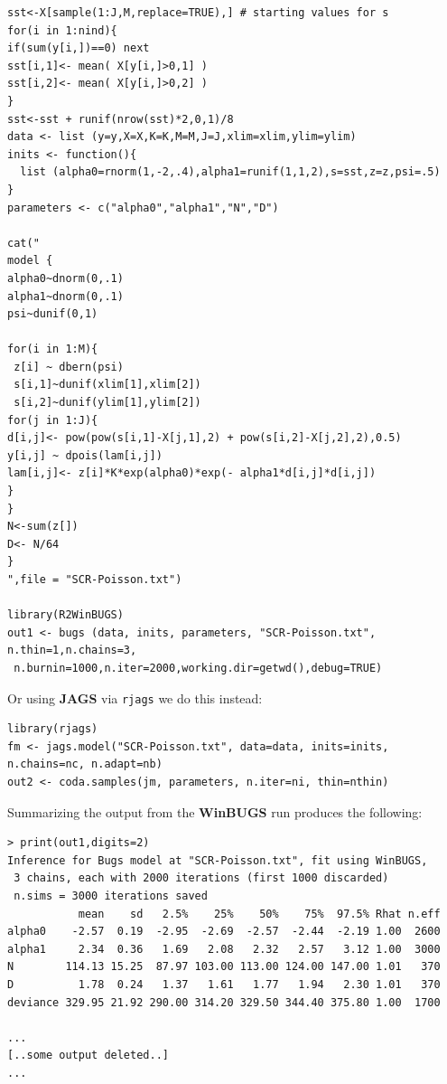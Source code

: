 {\small
\begin{verbatim}
sst<-X[sample(1:J,M,replace=TRUE),] # starting values for s
for(i in 1:nind){
if(sum(y[i,])==0) next
sst[i,1]<- mean( X[y[i,]>0,1] )
sst[i,2]<- mean( X[y[i,]>0,2] )
}
sst<-sst + runif(nrow(sst)*2,0,1)/8
data <- list (y=y,X=X,K=K,M=M,J=J,xlim=xlim,ylim=ylim)
inits <- function(){
  list (alpha0=rnorm(1,-2,.4),alpha1=runif(1,1,2),s=sst,z=z,psi=.5)
}
parameters <- c("alpha0","alpha1","N","D")

cat("
model {
alpha0~dnorm(0,.1)
alpha1~dnorm(0,.1)
psi~dunif(0,1)

for(i in 1:M){
 z[i] ~ dbern(psi)
 s[i,1]~dunif(xlim[1],xlim[2])
 s[i,2]~dunif(ylim[1],ylim[2])
for(j in 1:J){
d[i,j]<- pow(pow(s[i,1]-X[j,1],2) + pow(s[i,2]-X[j,2],2),0.5)
y[i,j] ~ dpois(lam[i,j])
lam[i,j]<- z[i]*K*exp(alpha0)*exp(- alpha1*d[i,j]*d[i,j])
}
}
N<-sum(z[])
D<- N/64
}
",file = "SCR-Poisson.txt")

library(R2WinBUGS)
out1 <- bugs (data, inits, parameters, "SCR-Poisson.txt", n.thin=1,n.chains=3,
 n.burnin=1000,n.iter=2000,working.dir=getwd(),debug=TRUE)
\end{verbatim}
}
{\flushleft Or using {\bf JAGS} via \mbox{\tt rjags} we do this instead: }
{\small
\begin{verbatim}
library(rjags)
fm <- jags.model("SCR-Poisson.txt", data=data, inits=inits, n.chains=nc, n.adapt=nb)
out2 <- coda.samples(jm, parameters, n.iter=ni, thin=nthin)
\end{verbatim}
}
{\flushleft 
Summarizing } the output from the {\bf WinBUGS}  run produces the following:
{\small
\begin{verbatim}
> print(out1,digits=2)
Inference for Bugs model at "SCR-Poisson.txt", fit using WinBUGS,
 3 chains, each with 2000 iterations (first 1000 discarded)
 n.sims = 3000 iterations saved
           mean    sd   2.5%    25%    50%    75%  97.5% Rhat n.eff
alpha0    -2.57  0.19  -2.95  -2.69  -2.57  -2.44  -2.19 1.00  2600
alpha1     2.34  0.36   1.69   2.08   2.32   2.57   3.12 1.00  3000
N        114.13 15.25  87.97 103.00 113.00 124.00 147.00 1.01   370
D          1.78  0.24   1.37   1.61   1.77   1.94   2.30 1.01   370
deviance 329.95 21.92 290.00 314.20 329.50 344.40 375.80 1.00  1700

...
[..some output deleted..]
...
\end{verbatim}
}



